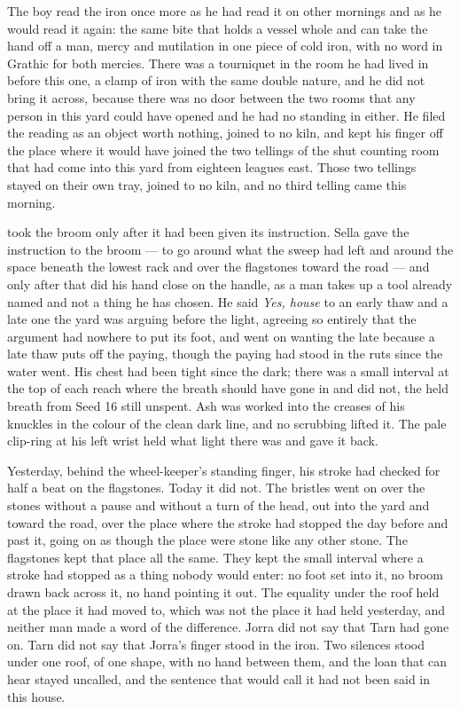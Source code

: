 The boy read the iron once more as he had read it on other mornings and as he would read it again: the same bite that holds a vessel whole and can take the hand off a man, mercy and mutilation in one piece of cold iron, with no word in Grathic for both mercies. There was a tourniquet in the room he had lived in before this one, a clamp of iron with the same double nature, and he did not bring it across, because there was no door between the two rooms that any person in this yard could have opened and he had no standing in either. He filed the reading as an object worth nothing, joined to no kiln, and kept his finger off the place where it would have joined the two tellings of the shut counting room that had come into this yard from eighteen leagues east. Those two tellings stayed on their own tray, joined to no kiln, and no third telling came this morning.

 took the broom only after it had been given its instruction. Sella gave the instruction to the broom --- to go around what the sweep had left and around the space beneath the lowest rack and over the flagstones toward the road --- and only after that did his hand close on the handle, as a man takes up a tool already named and not a thing he has chosen. He said \emph{Yes, house} to an early thaw and a late one the yard was arguing before the light, agreeing so entirely that the argument had nowhere to put its foot, and went on wanting the late because a late thaw puts off the paying, though the paying had stood in the ruts since the water went. His chest had been tight since the dark; there was a small interval at the top of each reach where the breath should have gone in and did not, the held breath from Seed 16 still unspent. Ash was worked into the creases of his knuckles in the colour of the clean dark line, and no scrubbing lifted it. The pale clip-ring at his left wrist held what light there was and gave it back.

Yesterday, behind the wheel-keeper's standing finger, his stroke had checked for half a beat on the flagstones. Today it did not. The bristles went on over the stones without a pause and without a turn of the head, out into the yard and toward the road, over the place where the stroke had stopped the day before and past it, going on as though the place were stone like any other stone. The flagstones kept that place all the same. They kept the small interval where a stroke had stopped as a thing nobody would enter: no foot set into it, no broom drawn back across it, no hand pointing it out. The equality under the roof held at the place it had moved to, which was not the place it had held yesterday, and neither man made a word of the difference. Jorra did not say that Tarn had gone on. Tarn did not say that Jorra's finger stood in the iron. Two silences stood under one roof, of one shape, with no hand between them, and the loan that can hear stayed uncalled, and the sentence that would call it had not been said in this house.


